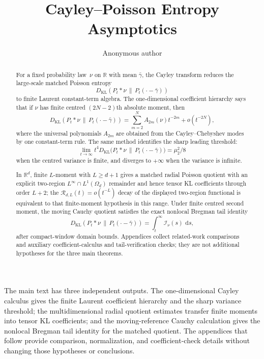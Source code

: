 \documentclass[11pt,reqno]{amsart}
\title[Cayley--Poisson Entropy Asymptotics]{Cayley--Poisson Entropy Asymptotics}
\author{Anonymous author}
\date{}
\theoremstyle{plain}
\theoremstyle{definition}
\numberwithin{equation}{section}
\newcommand{\RR}{\mathbb{R}}
\newcommand{\dd}{\,\mathrm{d}}
\begin{document}
\begin{abstract}
For a fixed probability law~\(\nu\) on \(\RR\) with mean \(\bar{\gamma}\), the
Cayley transform reduces the large-scale matched Poisson entropy
\[
  D_{\mathrm{KL}}(P_t*\nu\,\|\,P_t(\cdot-\bar{\gamma}))
\]
to finite Laurent constant-term algebra.  The one-dimensional coefficient
hierarchy says that if \(\nu\) has finite centred
\((2N-2)\)th absolute moment, then
\[
D_{\mathrm{KL}}(P_t*\nu\,\|\,P_t(\cdot-\bar{\gamma}))
=\sum_{m=2}^{N}A_{2m}(\nu)t^{-2m}+o(t^{-2N}),
\]
where the universal polynomials \(A_{2m}\) are obtained from the
Cayley--Chebyshev modes by one constant-term rule.  The same method identifies
the sharp leading threshold:
\[
\lim_{t\to\infty}t^4
D_{\mathrm{KL}}\bigl(P_t*\nu\,\|\,P_t(\cdot-\bar{\gamma})\bigr)
=\mu_2^2/8
\]
when the centred variance is finite, and diverges to \(+\infty\) when the
variance is infinite.

In \(\RR^d\), finite \(L\)-moment with \(L\ge d+1\) gives a matched radial
Poisson quotient with an explicit two-region \(L^\infty\cap L^1(\Omega_d)\)
remainder and hence tensor KL coefficients through order \(L+2\); the
\(\mathcal R_{d,L}(t)=o(t^{-L})\) decay of the displayed two-region
functional is equivalent to that finite-moment hypothesis in this range.
Under finite centred second moment, the
moving Cauchy quotient satisfies the exact nonlocal Bregman tail identity
\[
D_{\mathrm{KL}}(P_t*\nu\,\|\,P_t(\cdot-\bar{\gamma}))
=\int_t^\infty \mathcal I_\nu(s)\,\dd s,
\]
after compact-window domain bounds.  Appendices collect related-work
comparisons and auxiliary coefficient-calculus and tail-verification checks;
they are not additional hypotheses for the three main theorems.
\end{abstract}
\maketitle









The main text has three independent outputs.  The one-dimensional Cayley
calculus gives the finite Laurent coefficient hierarchy and the sharp
variance threshold; the multidimensional radial quotient estimates transfer
finite moments into tensor KL coefficients; and the moving-reference Cauchy
calculation gives the nonlocal Bregman tail identity for the matched
quotient.  The appendices that follow provide comparison, normalization, and
coefficient-check details without changing those hypotheses or conclusions.
\end{document}
